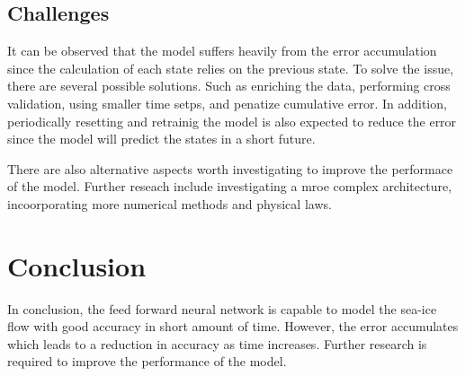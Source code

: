 \documentclass[12pt, a4paper]{article}
\begin{document}
\subsection{Challenges}
It can be observed that the model suffers heavily from the error accumulation since the calculation of each state relies on the previous state. To solve the issue, there are several possible solutions. Such as enriching the data, performing cross validation, using smaller time setps, and penatize cumulative error. In addition, periodically resetting and retrainig the model is also expected to reduce the error since the model will predict the states in a short future. 

There are also alternative aspects worth investigating to improve the performace of the model. Further reseach include investigating a mroe complex architecture, incoorporating more numerical methods and physical laws.

\section{Conclusion}
In conclusion, the feed forward neural network is capable to model the sea-ice flow with good accuracy in short amount of time. However, the error accumulates which leads to a reduction in accuracy as time increases. Further research is required to improve the performance of the model.
\end{document}
